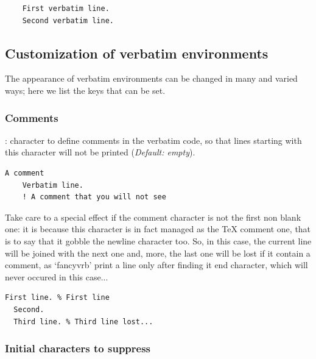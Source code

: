\documentclass[twoside]{article}
\newcommand\FVrbPackage{`\textsf{fancyvrb}'}
\providecommand\optname[1]{\textsf{#1}}
\newenvironment{optlist}{\begin{description}%
  \renewcommand\makelabel[1]{%
    \descriptionlabel{\mdseries\optname{##1}}}%
  \itemsep0.25\itemsep}%
 {\end{description}}
\begin{document}
\begin{SideBySideExample}
  \begin{Verbatim}
    First verbatim line.
    Second verbatim line.
  \end{Verbatim}
\end{SideBySideExample}

\subsection{Customization of verbatim environments}

  The appearance of verbatim environments can be changed in many and
varied ways; here we list the keys that can be set. 

\subsubsection{Comments}

\begin{optlist}
  \item[commentchar (character)]: character to define comments in the
  verbatim code, so that lines starting with this character will not be
  printed (\emph{Default: empty}).
\end{optlist}

\begin{SideBySideExample}
  \begin{Verbatim}[commentchar=!]
    A comment
    Verbatim line.
    ! A comment that you will not see
  \end{Verbatim}
\end{SideBySideExample}

  Take care to a special effect if the comment character is not the first
non blank one: it is because this character is in fact managed as the \TeX{}
comment one, that is to say that it gobble the newline character too. So, in
this case, the current line will be joined with the next one and, more, the
last one will be lost if it contain a comment, as \FVrbPackage{} print a
line only after finding it end character, which will never occured in this
case...

\begin{SideBySideExample}
  \begin{Verbatim}[commentchar=\%]
  First line. % First line
  Second.
  Third line. % Third line lost...
  \end{Verbatim}
\end{SideBySideExample}

\subsubsection{Initial characters to suppress}
\end{document}
